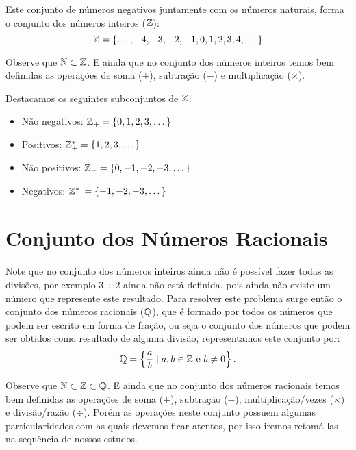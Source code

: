 Este conjunto de números negativos juntamente com os números naturais, forma o conjunto dos números inteiros ($\mathbb{Z}$):
\begin{equation*}
\mathbb{Z}= \{ \ldots , -4, -3, -2, -1, 0, 1, 2, 3, 4, \cdots \}
\end{equation*}

Observe que $\mathbb{N} \subset \mathbb{Z}$. E ainda que no conjunto dos números inteiros temos bem definidas as operações de soma ($+$), subtração ($-$) e multiplicação ($\times$).

Destacamos os seguintes subconjuntos de $\mathbb{Z}$:
\begin{itemize}
    \item Não negativos: $\mathbb{Z}_{+}=\{0,1,2,3,\dots\}$
    \item Positivos: $\mathbb{Z}_{+}^*=\{1,2,3,\dots\}$
    \item Não positivos: $\mathbb{Z}_{-}=\{0,-1,-2,-3,\dots\}$
    \item Negativos: $\mathbb{Z}_{-}^*=\{-1,-2,-3,\dots\}$
\end{itemize}

\section{Conjunto dos Números Racionais}

Note que no conjunto dos números inteiros ainda não é possível fazer todas as divisões, por exemplo $3 \div 2$ ainda não está definida, pois ainda não existe um número que represente este resultado. Para resolver este problema surge então o conjunto dos números racionais ($\mathbb{Q}$), que é formado por todos os números que podem ser escrito em forma de fração, ou seja o conjunto dos números que podem ser obtidos como resultado de alguma divisão, representamos este conjunto por:
\begin{equation*}
\mathbb{Q}= \left\{ \frac{a}{b} \mid a, b \in \mathbb{Z} \text{ e } b \neq 0 \right\}.
\end{equation*}

Observe que $\mathbb{N} \subset \mathbb{Z} \subset \mathbb{Q}$. E ainda que no conjunto dos números racionais temos bem definidas as operações de soma ($+$), subtração ($-$), multiplicação/vezes ($\times$) e divisão/razão ($\div$). Porém as operações neste conjunto possuem algumas particularidades com as quais devemos ficar atentos, por isso iremos retomá-las na sequência de nossos estudos.



